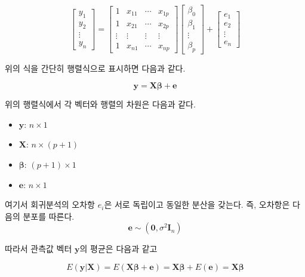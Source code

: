 \documentclass[
]{book}
\providecommand{\tightlist}{%
  \setlength{\itemsep}{0pt}\setlength{\parskip}{0pt}}
\theoremstyle{definition}
\theoremstyle{definition}
\theoremstyle{definition}
\theoremstyle{remark}
\begin{document}
\[ 
\begin{bmatrix}
y_{1} \\
y_{2} \\
\vdots \\
y_{n}
\end{bmatrix} =
\begin{bmatrix}
1 & x_{11} & \cdots & x_{1p} \\
1 & x_{21} & \cdots & x_{2p} \\
\vdots & \vdots & \vdots & \vdots \\
1 & x_{n1} & \cdots & x_{np}
\end{bmatrix}
\begin{bmatrix}
\beta_{0} \\
\beta_{1} \\
\vdots \\
\beta_{p}
\end{bmatrix}
+
\begin{bmatrix}
 e_{1} \\
 e_{2} \\
\vdots \\
 e_{n}
\end{bmatrix}
\]

위의 식을 간단히 행렬식으로 표시하면 다음과 같다.

\begin{equation} 
\bm y = \bm X \bm \beta + \bm e
\label{eq:multireg2}
\end{equation}

위의 행렬식에서 각 벡터와 행렬의 차원은 다음과 같다.

\begin{itemize}
\tightlist
\item
  \(\bm y\): \(n \times 1\)
\item
  \(\bm X\): \(n \times (p+1)\)
\item
  \(\bm \beta\): \((p+1) \times 1\)
\item
  \(\bm e\): \(n \times 1\)
\end{itemize}

여기서 회귀분석의 오차항 \(e_i\)은 서로 독립이고 동일한 분산을 갖는다. 즉, 오차항은 다음의 분포를 따른다.
\[ \bm e  \sim (\bm 0,\sigma^2 \bm I_n) \]

따라서 관측값 벡터 \(\bm y\)의 평균은 다음과 같고

\begin{equation}
 E(\bm y|\bm X) = E(\bm X \bm \beta+\bm e)= \bm X \bm \beta + E(\bm e) = \bm X \bm \beta
\label{eq:multiregmean}
\end{equation}
\end{document}
